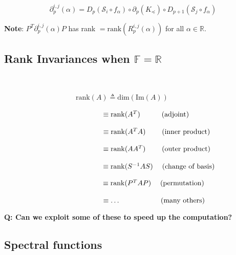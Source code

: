\documentclass[
  letterpaper,
  DIV=11,
  numbers=noendperiod,
  oneside]{scrartcl}
\begin{document}
\[ 
\boxed{
\partial_p^{i,j}(\alpha) = D_p(\mathcal{S}_i \circ f_\alpha) \circ \partial_p(K_\preceq) \circ D_{p+1}(\mathcal{S}_j \circ f_\alpha) 
}
\]

\textbf{Note}: \(P^T \partial_p^{i,j}(\alpha) P\) has rank
\(= \mathrm{rank}(R_p^{i,j}(\alpha))\) for all
\(\alpha \in \mathbb{R}\).


\subsection{\texorpdfstring{Rank Invariances when
\(\mathbb{F} = \mathbb{R}\)}{Rank Invariances when \textbackslash mathbb\{F\} = \textbackslash mathbb\{R\}}}\label{rank-invariances-when-mathbbf-mathbbr}

    

\(\hspace{10em} \mathrm{rank}(A) \triangleq \mathrm{dim}(\mathrm{Im}(A))\)

\(\hspace{10em} \hphantom{\mathrm{rank}(A)} \equiv \mathrm{rank}(A^T) \quad \quad \quad \text{(adjoint)}\)

\(\hspace{10em} \hphantom{\mathrm{rank}(A)} \equiv \mathrm{rank}(A^T A) \quad \quad \; \text{(inner product)}\)

\(\hspace{10em} \hphantom{\mathrm{rank}(A)} \equiv \mathrm{rank}(A A^T) \quad \quad \; \text{(outer product)}\)

\(\hspace{10em} \hphantom{\mathrm{rank}(A)} \equiv \mathrm{rank}(S^{-1}AS) \quad \; \text{(change of basis)}\)

\(\hspace{10em} \hphantom{\mathrm{rank}(A)} \equiv \mathrm{rank}(P^T A P) \quad \; \text{(permutation)}\)

\(\hspace{10em} \hphantom{\mathrm{rank}(A)} \equiv \dots \quad \quad \quad \quad \quad \quad \! \! \text{(many others)}\)

\textbf{Q: Can we exploit some of these to speed up the computation?}

\subsection{Spectral functions}\label{spectral-functions}
\end{document}
